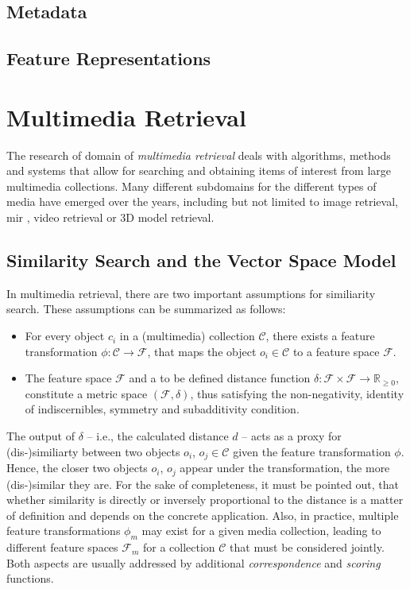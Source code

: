 \subsection{Metadata}

\subsection{Feature Representations}


\section{Multimedia Retrieval}

The research of domain of \emph{multimedia retrieval} deals with algorithms, methods and systems that allow for searching and obtaining items of interest from large multimedia collections. Many different subdomains for the different types of media have emerged over the years, including but not limited to image retrieval, \acrfull{mir} \cite{Simonetta:2019Multimodal}, video retrieval or 3D model retrieval.

\subsection{Similarity Search and the Vector Space Model}

In multimedia retrieval, there are two important assumptions for similiarity search. These assumptions can be summarized as follows:

\begin{itemize}
    \item For every object $c_{i}$ in a (multimedia) collection $\mathcal{C}$, there exists a feature transformation $\phi \colon \mathcal{C} \to \mathcal{F}$, that maps the object $o_{i} \in \mathcal{C}$ to a feature space $\mathcal{F}$.
    \item The feature space $\mathcal{F}$ and a to be defined distance function $\delta \colon \mathcal{F} \times \mathcal{F} \to \mathbb{R}_{\geq 0}$, constitute a metric space $(\mathcal{F},\delta)$, thus satisfying the non-negativity, identity of indiscernibles, symmetry and subadditivity condition.
\end{itemize}

The output of $\delta$ -- i.e., the calculated distance $d$ -- acts as a proxy for (dis-)similiarty between two objects $o_{i}$, $o_{j} \in \mathcal{C}$ given the feature transformation $\phi$. Hence, the closer two objects $o_{i}$, $o_{j}$ appear under the transformation, the more (dis-)similar they are. For the sake of completeness, it must be pointed out, that whether similarity is directly or inversely proportional to the distance is a matter of definition and depends on the concrete application. Also, in practice, multiple feature transformations $\phi_m$ may exist for a given media collection, leading to different feature spaces $\mathcal{F}_m$ for a collection $\mathcal{C}$ that must be considered jointly. Both aspects are usually addressed by additional \emph{correspondence} and \emph{scoring} functions.

